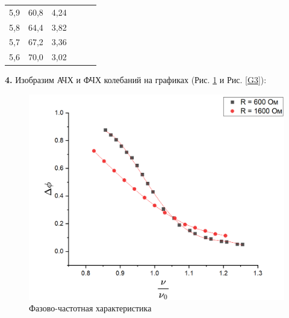 \documentclass[a4paper, 12pt]{article}
\begin{document}
\begin{table}[H]
\begin{tabular}{|ccc|ccc}
	\multicolumn{1}{|c|}{5,9}       & \multicolumn{1}{c|}{60,8}            & 4,24   & \multicolumn{1}{l}{}           & \multicolumn{1}{l}{}                 & \multicolumn{1}{l}{}        \\ \cline{1-3}
	\multicolumn{1}{|c|}{5,8}       & \multicolumn{1}{c|}{64,4}            & 3,82   & \multicolumn{1}{l}{}           & \multicolumn{1}{l}{}                 & \multicolumn{1}{l}{}        \\ \cline{1-3}
	\multicolumn{1}{|c|}{5,7}       & \multicolumn{1}{c|}{67,2}            & 3,36   & \multicolumn{1}{l}{}           & \multicolumn{1}{l}{}                 & \multicolumn{1}{l}{}        \\ \cline{1-3}
	\multicolumn{1}{|c|}{5,6}       & \multicolumn{1}{c|}{70,0}            & 3,02   & \multicolumn{1}{l}{}           & \multicolumn{1}{l}{}                 & \multicolumn{1}{l}{}        \\ \cline{1-3}
	\end{tabular}
	\end{table}

\textbf{4.} Изобразим АЧХ и ФЧХ колебаний на графиках (Рис. \ref{G5} и Рис. \ref{G3}):

\begin{figure}[H]
\begin{center}
\includegraphics[width=\textwidth]{G5.png}
\caption{Фазово-частотная характеристика} \label{G5}
\end{center}
\end{figure}
\end{document}
